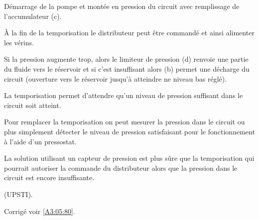 \ifprof
\begin{corrige}
Démarrage de la pompe et montée en pression du circuit avec remplissage de l’accumulateur (c).

À la fin de la temporisation le distributeur peut être commandé et ainsi alimenter les vérins.

Si la pression augmente trop, alors le limiteur de pression (d) renvoie une partie du fluide vers le
réservoir et si c’est insuffisant alors (b) permet une décharge du circuit (ouverture vers le réservoir
jusqu’à atteindre ne niveau bas réglé).

La temporisation permet d’attendre qu’un niveau de pression suffisant dans le circuit soit atteint.

Pour remplacer la temporisation on peut mesurer la pression dans le circuit ou plus simplement détecter
le niveau de pression satisfaisant pour le fonctionnement à l’aide d’un pressostat.

La solution utilisant un capteur de pression est plus sûre que la temporisation qui pourrait autoriser la
commande du distributeur alors que la pression dans le circuit est encore insuffisante.

(UPSTI). 
\end{corrige}
\else
\fi






\ifprof
\else
\begin{flushright}
\footnotesize{Corrigé  voir \ref{A3:05:80}.}
\end{flushright}%
\fi